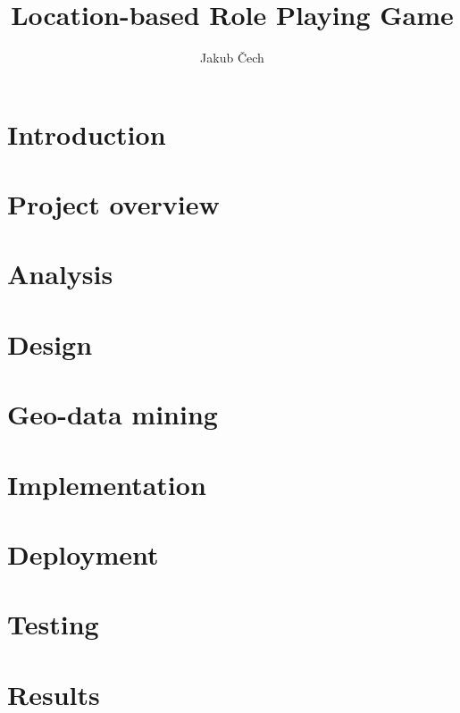 \documentclass[thesis=B,english]{FITthesis}[2012/10/20]
\title{Location-based Role Playing Game}
\author{Jakub {\v C}ech} %
\begin{document}
	
	\chapter{Introduction}
	
	
	
	\chapter{Project overview}
	
	
	\chapter{Analysis}
	
	
	\chapter{Design}
	
	
	\chapter{Geo-data mining}
	
	
	\chapter{Implementation}
	
	
	\chapter{Deployment}
	
	
	\chapter{Testing}
	
	
	
	\chapter{Results}
	
	
	\printbibliography
\end{document}
